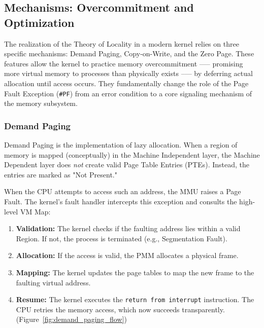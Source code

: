 \documentclass[a4paper,10pt,twoside]{report}
\theoremstyle{definition}
\begin{document}
\subsection{Mechanisms: Overcommitment and Optimization}
\label{subsec:vmm_mechanisms}

The realization of the Theory of Locality in a modern kernel relies on three specific mechanisms: Demand Paging, Copy-on-Write, and the Zero Page. These features allow the kernel to practice memory overcommitment —-- promising more virtual memory to processes than physically exists --— by deferring actual allocation until access occurs. They fundamentally change the role of the Page Fault Exception (\texttt{\#PF}) from an error condition to a core signaling mechanism of the memory subsystem.

\subsubsection{Demand Paging}

Demand Paging is the implementation of lazy allocation. When a region of memory is mapped (conceptually) in the Machine Independent layer, the Machine Dependent layer does \textit{not} create valid Page Table Entries (PTEs). Instead, the entries are marked as "Not Present."

When the CPU attempts to access such an address, the MMU raises a Page Fault. The kernel's fault handler intercepts this exception and consults the high-level VM Map:
\begin{enumerate}
    \item \textbf{Validation:} The kernel checks if the faulting address lies within a valid Region. If not, the process is terminated (e.g., Segmentation Fault).
    \item \textbf{Allocation:} If the access is valid, the PMM allocates a physical frame.
    \item \textbf{Mapping:} The kernel updates the page tables to map the new frame to the faulting virtual address.
    \item \textbf{Resume:} The kernel executes the \texttt{return from interrupt} instruction. The CPU retries the memory access, which now succeeds transparently. (Figure~\ref{fig:demand_paging_flow})
\end{enumerate}
\end{document}
